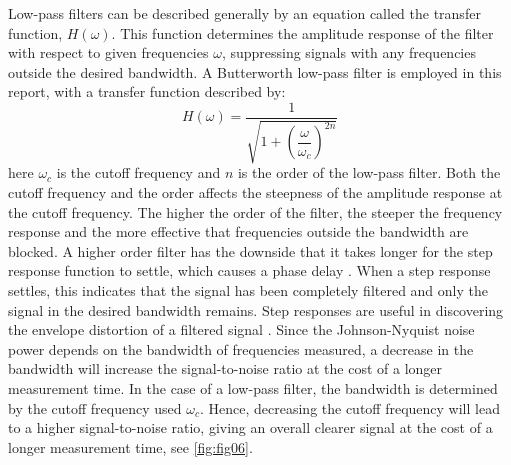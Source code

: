 \documentclass[a4paper,12pt, notitlepage]{article}
\begin{document}
Low-pass filters can be described generally by an equation called the transfer function, $H(\omega)$. This function determines the amplitude response of the filter with respect to given frequencies $\omega$, suppressing signals with any frequencies outside the desired bandwidth. 
A Butterworth low-pass filter is employed in this report, with a transfer function described by:
\begin{equation}
    H(\omega) = \dfrac{1}{\sqrt{1 + \left(\dfrac{\omega}{\omega_{c}}\right)^{2n}}}
\end{equation}
here $\omega_{c}$ is the cutoff frequency and $n$ is the order of the low-pass filter. Both the cutoff frequency and the order affects the steepness of the amplitude response at the cutoff frequency. The higher the order of the filter, the steeper the frequency response and the more effective that frequencies outside the bandwidth are blocked. A higher order filter has the downside that it takes longer for the step response function to settle, which causes a phase delay \cite{LockinAmpRef01}. When a step response settles, this indicates that the signal has been completely filtered and only the signal in the desired bandwidth remains. Step responses are useful in discovering the envelope distortion of a filtered signal \cite{StepResponseRef}.
Since the Johnson-Nyquist noise power depends on the bandwidth of frequencies measured, a decrease in the bandwidth will increase the signal-to-noise ratio at the cost of a longer measurement time. In the case of a low-pass filter, the bandwidth is determined by the cutoff frequency used $\omega_{c}$. Hence, decreasing the cutoff frequency will lead to a higher signal-to-noise ratio, giving an overall clearer signal at the cost of a longer measurement time, see \cref{fig:fig06}.
\end{document}
